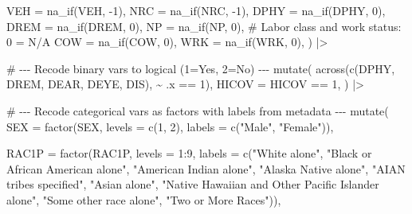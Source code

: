 \documentclass[
  letterpaper,
  DIV=11,
  numbers=noendperiod]{scrartcl}
\newenvironment{Shaded}{\begin{snugshade}}{\end{snugshade}}
\newcommand{\AttributeTok}[1]{\textcolor[rgb]{0.40,0.45,0.13}{#1}}
\newcommand{\CommentTok}[1]{\textcolor[rgb]{0.37,0.37,0.37}{#1}}
\newcommand{\DecValTok}[1]{\textcolor[rgb]{0.68,0.00,0.00}{#1}}
\newcommand{\FunctionTok}[1]{\textcolor[rgb]{0.28,0.35,0.67}{#1}}
\newcommand{\NormalTok}[1]{\textcolor[rgb]{0.00,0.23,0.31}{#1}}
\newcommand{\SpecialCharTok}[1]{\textcolor[rgb]{0.37,0.37,0.37}{#1}}
\newcommand{\StringTok}[1]{\textcolor[rgb]{0.13,0.47,0.30}{#1}}
\begin{document}
\begin{Shaded}
\begin{Highlighting}[]
    \AttributeTok{VEH    =} \FunctionTok{na\_if}\NormalTok{(VEH, }\SpecialCharTok{{-}}\DecValTok{1}\NormalTok{),}
    \AttributeTok{NRC    =} \FunctionTok{na\_if}\NormalTok{(NRC, }\SpecialCharTok{{-}}\DecValTok{1}\NormalTok{),}
    \AttributeTok{DPHY   =} \FunctionTok{na\_if}\NormalTok{(DPHY, }\DecValTok{0}\NormalTok{),}
    \AttributeTok{DREM   =} \FunctionTok{na\_if}\NormalTok{(DREM, }\DecValTok{0}\NormalTok{),}
    \AttributeTok{NP     =} \FunctionTok{na\_if}\NormalTok{(NP, }\DecValTok{0}\NormalTok{),}
    \CommentTok{\# Labor class and work status: 0 = N/A}
    \AttributeTok{COW    =} \FunctionTok{na\_if}\NormalTok{(COW, }\DecValTok{0}\NormalTok{),}
    \AttributeTok{WRK    =} \FunctionTok{na\_if}\NormalTok{(WRK, }\DecValTok{0}\NormalTok{),}
\NormalTok{  ) }\SpecialCharTok{|\textgreater{}}

  \CommentTok{\# {-}{-}{-} Recode binary vars to logical (1=Yes, 2=No) {-}{-}{-}}
  \FunctionTok{mutate}\NormalTok{(}
    \FunctionTok{across}\NormalTok{(}\FunctionTok{c}\NormalTok{(DPHY, DREM, DEAR, DEYE, DIS), }\SpecialCharTok{\textasciitilde{}}\NormalTok{ .x }\SpecialCharTok{==} \DecValTok{1}\NormalTok{),}
    \AttributeTok{HICOV =}\NormalTok{ HICOV }\SpecialCharTok{==} \DecValTok{1}\NormalTok{,}
\NormalTok{  ) }\SpecialCharTok{|\textgreater{}}

  \CommentTok{\# {-}{-}{-} Recode categorical vars as factors with labels from metadata {-}{-}{-}}
  \FunctionTok{mutate}\NormalTok{(}
    \AttributeTok{SEX =} \FunctionTok{factor}\NormalTok{(SEX, }\AttributeTok{levels =} \FunctionTok{c}\NormalTok{(}\DecValTok{1}\NormalTok{, }\DecValTok{2}\NormalTok{),}
                 \AttributeTok{labels =} \FunctionTok{c}\NormalTok{(}\StringTok{"Male"}\NormalTok{, }\StringTok{"Female"}\NormalTok{)),}

    \AttributeTok{RAC1P =} \FunctionTok{factor}\NormalTok{(RAC1P, }\AttributeTok{levels =} \DecValTok{1}\SpecialCharTok{:}\DecValTok{9}\NormalTok{,}
                   \AttributeTok{labels =} \FunctionTok{c}\NormalTok{(}\StringTok{"White alone"}\NormalTok{, }\StringTok{"Black or African American alone"}\NormalTok{,}
                              \StringTok{"American Indian alone"}\NormalTok{, }\StringTok{"Alaska Native alone"}\NormalTok{,}
                              \StringTok{"AIAN tribes specified"}\NormalTok{, }\StringTok{"Asian alone"}\NormalTok{,}
                              \StringTok{"Native Hawaiian and Other Pacific Islander alone"}\NormalTok{,}
                              \StringTok{"Some other race alone"}\NormalTok{, }\StringTok{"Two or More Races"}\NormalTok{)),}


\end{Highlighting}
\end{Shaded}
\end{document}
